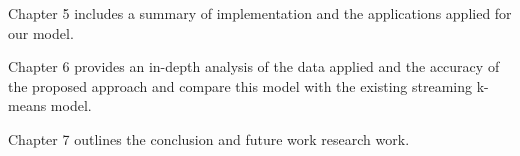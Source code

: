 Chapter 5 includes a summary of implementation and the applications applied for our model.

Chapter 6 provides an in-depth analysis of the data applied and the accuracy of the proposed approach and compare this model with the existing streaming k-means model.

Chapter 7 outlines the conclusion and future work research work.
% 









